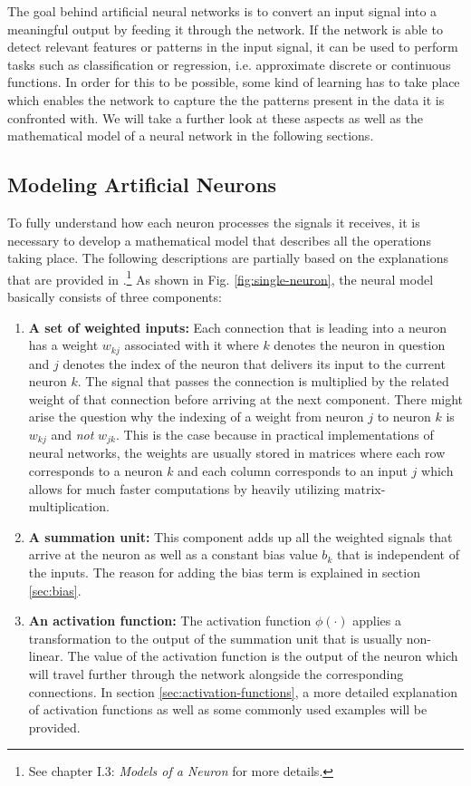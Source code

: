 The goal behind artificial neural networks is to convert an input
signal into a meaningful output by feeding it through the network. If
the network is able to detect relevant features or patterns in the
input signal, it can be used to perform tasks such as classification
or regression, i.e. approximate discrete or continuous functions.
In order for this to be possible, some kind of learning has to take
place which enables the network to capture the the patterns present in
the data it
is confronted with. We will take a further look at these aspects as
well as the mathematical model of a neural network in the following
sections.

\subsection{Modeling Artificial Neurons}
\label{sec:artificial-neurons}
To fully understand how each neuron processes the signals it receives,
it is necessary to develop a mathematical model that describes all the
operations taking place. The following descriptions are partially
based on the explanations that are provided in \cite{Haykin}.\footnote{See
  chapter I.3: \textit{Models of a Neuron} for more details.}
As shown in Fig. \ref{fig:single-neuron}, the neural model
basically consists of three components:
\begin{enumerate}
  \item \textbf{A set of weighted inputs:} Each connection that is
    leading into a neuron has a weight \(w_{kj}\) associated with it
    where \(k\) denotes the neuron in question and \(j\) denotes the
    index of the neuron that delivers its input to the current neuron
    \(k\). The signal that
    passes the connection is multiplied by the
    related weight of that connection before arriving at the next
    component.
    There might arise the question why the indexing of
    a weight from neuron \(j\) to neuron \(k\) is \(w_{kj}\) and
    \textit{not} \(w_{jk}\). This is the case because in practical
    implementations of neural networks, the weights are
    usually stored in matrices where each row corresponds to a
    neuron \(k\) and each column corresponds to an input \(j\) which
    allows for much faster computations by heavily utilizing
    matrix-multiplication.
  \item \textbf{A summation unit:} This component adds up all the
    weighted signals that arrive at the neuron as well as a constant
    bias value
    \(b_k\) that is independent of the inputs. The reason for adding
    the bias term is explained in section \ref{sec:bias}.
  \item \textbf{An activation function:} The activation function
    \(\phi(\cdot)\) applies a transformation to the output of the
    summation unit that is usually non-linear. The value of
    the activation function is the output of the neuron which will
    travel further through the network alongside the corresponding
    connections. In section \ref{sec:activation-functions}, a more
    detailed explanation of activation functions as well as some
    commonly used examples will be provided.
\end{enumerate}
